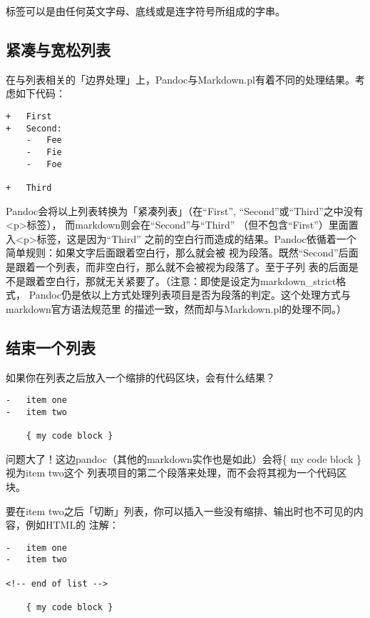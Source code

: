 \documentclass[cn]{elegantbook}
\begin{document}
标签可以是由任何英文字母、底线或是连字符号所组成的字串。

\hypertarget{ux7d27ux51d1ux4e0eux5bbdux677eux5217ux8868}{%
\subsection{紧凑与宽松列表}\label{ux7d27ux51d1ux4e0eux5bbdux677eux5217ux8868}}

在与列表相关的「边界处理」上，Pandoc与Markdown.pl有着不同的处理结果。考虑如下代码：

\begin{lstlisting}
+   First
+   Second:
    -   Fee
    -   Fie
    -   Foe

+   Third
\end{lstlisting}

Pandoc会将以上列表转换为「紧凑列表」（在``First'',
``Second''或``Third''之中没有\textless p\textgreater 标签），
而markdown则会在``Second''与``Third''
（但不包含``First''）里面置入\textless p\textgreater 标签，这是因为``Third''
之前的空白行而造成的结果。Pandoc依循着一个简单规则：如果文字后面跟着空白行，那么就会被
视为段落。既然``Second''后面是跟着一个列表，而非空白行，那么就不会被视为段落了。至于子列
表的后面是不是跟着空白行，那就无关紧要了。（注意：即使是设定为markdown\_strict格式，
Pandoc仍是依以上方式处理列表项目是否为段落的判定。这个处理方式与markdown官方语法规范里
的描述一致，然而却与Markdown.pl的处理不同。）

\hypertarget{ux7ed3ux675fux4e00ux4e2aux5217ux8868}{%
\subsection{结束一个列表}\label{ux7ed3ux675fux4e00ux4e2aux5217ux8868}}

如果你在列表之后放入一个缩排的代码区块，会有什么结果？

\begin{lstlisting}
-   item one
-   item two

    { my code block }
\end{lstlisting}

问题大了！这边pandoc（其他的markdown实作也是如此）会将\{ my code block
\}视为item two这个
列表项目的第二个段落来处理，而不会将其视为一个代码区块。

要在item
two之后「切断」列表，你可以插入一些没有缩排、输出时也不可见的内容，例如HTML的
注解：

\begin{lstlisting}
-   item one
-   item two

<!-- end of list -->

    { my code block }
\end{lstlisting}
\end{document}
